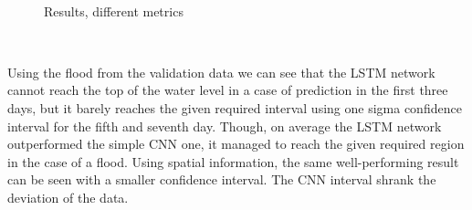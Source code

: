 \documentclass{article}
\begin{document}
\

\begin{figure}[h]
  \caption{Results, different metrics}
\end{figure}

\

Using the flood from the validation data we can see that the LSTM network
cannot reach the top of the water level in a case of prediction in the first
three days, but it barely reaches the given required interval using one sigma
confidence interval for the fifth and seventh day. Though, on average the LSTM
network outperformed the simple CNN one, it managed to reach the given
required region in the case of a flood. Using spatial information, the same
well-performing result can be seen with a smaller confidence interval. The CNN
interval shrank the deviation of the data.
\end{document}
